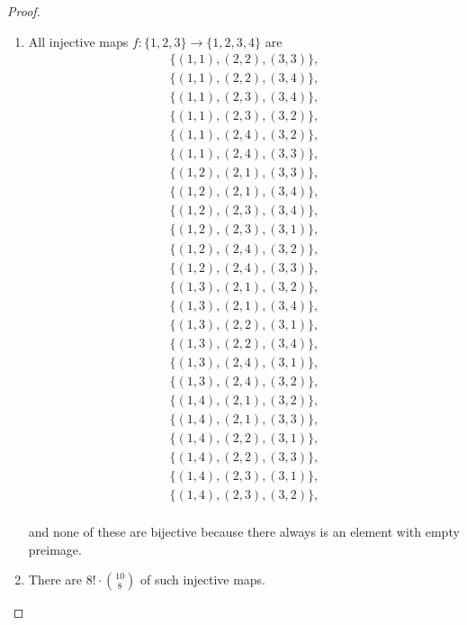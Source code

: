 \begin{proof}
    \begin{enumerate}[label={(\alph*)}]
        \item All injective maps $f: \{ 1, 2, 3 \}\to \{ 1, 2, 3, 4 \}$ are
              \begin{align*}
                  \{ (1, 1), (2, 2), (3, 3) \}, \\
                  \{ (1, 1), (2, 2), (3, 4) \}, \\
                  \{ (1, 1), (2, 3), (3, 4) \}, \\
                  \{ (1, 1), (2, 3), (3, 2) \}, \\
                  \{ (1, 1), (2, 4), (3, 2) \}, \\
                  \{ (1, 1), (2, 4), (3, 3) \}, \\
                  \{ (1, 2), (2, 1), (3, 3) \}, \\
                  \{ (1, 2), (2, 1), (3, 4) \}, \\
                  \{ (1, 2), (2, 3), (3, 4) \}, \\
                  \{ (1, 2), (2, 3), (3, 1) \}, \\
                  \{ (1, 2), (2, 4), (3, 2) \}, \\
                  \{ (1, 2), (2, 4), (3, 3) \}, \\
                  \{ (1, 3), (2, 1), (3, 2) \}, \\
                  \{ (1, 3), (2, 1), (3, 4) \}, \\
                  \{ (1, 3), (2, 2), (3, 1) \}, \\
                  \{ (1, 3), (2, 2), (3, 4) \}, \\
                  \{ (1, 3), (2, 4), (3, 1) \}, \\
                  \{ (1, 3), (2, 4), (3, 2) \}, \\
                  \{ (1, 4), (2, 1), (3, 2) \}, \\
                  \{ (1, 4), (2, 1), (3, 3) \}, \\
                  \{ (1, 4), (2, 2), (3, 1) \}, \\
                  \{ (1, 4), (2, 2), (3, 3) \}, \\
                  \{ (1, 4), (2, 3), (3, 1) \}, \\
                  \{ (1, 4), (2, 3), (3, 2) \}, \\
              \end{align*}

              and none of these are bijective because there always is an element with empty preimage.
        \item There are $8!\cdot \binom{10}{8}$ of such injective maps.
    \end{enumerate}
\end{proof}

